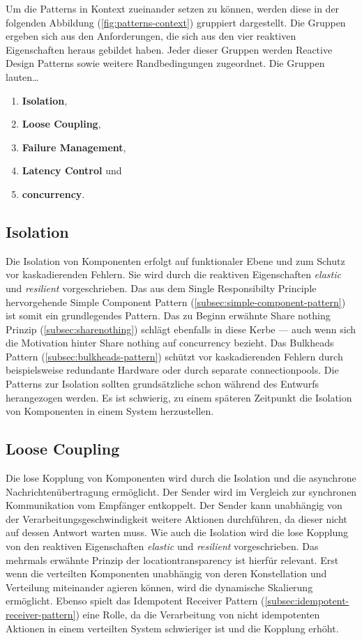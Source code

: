 Um die Patterns in Kontext zueinander setzen zu können, werden diese in der folgenden Abbildung (\ref{fig:patterns-context}) gruppiert dargestellt. Die Gruppen ergeben sich aus den Anforderungen, die sich aus den vier reaktiven Eigenschaften heraus gebildet haben. Jeder dieser Gruppen werden Reactive Design Patterns sowie weitere Randbedingungen zugeordnet. Die Gruppen lauten\ldots

\begin{enumerate}
  \item \textbf{Isolation},
  \item \textbf{Loose Coupling},
  \item \textbf{Failure Management},
  \item \textbf{Latency Control} und
  \item \textbf{\gls{concurrency}}.
\end{enumerate}

\pagebreak

\subsection{Isolation}
Die Isolation von Komponenten erfolgt auf funktionaler Ebene und zum Schutz vor kaskadierenden Fehlern. Sie wird durch die reaktiven Eigenschaften \textit{elastic} und \textit{resilient} vorgeschrieben. Das aus dem Single Responsibilty Principle hervorgehende Simple Component Pattern (\ref{subsec:simple-component-pattern}) ist somit ein grundlegendes Pattern. Das zu Beginn erwähnte Share nothing Prinzip (\ref{subsec:sharenothing}) schlägt ebenfalls in diese Kerbe --- auch wenn sich die Motivation hinter Share nothing auf \gls{concurrency} bezieht. Das Bulkheads Pattern (\ref{subsec:bulkheads-pattern}) schützt vor kaskadierenden Fehlern durch beispielsweise redundante Hardware oder durch separate \glspl{connectionpool}. Die Patterns zur Isolation sollten grundsätzliche schon während des Entwurfs herangezogen werden. Es ist schwierig, zu einem späteren Zeitpunkt die Isolation von Komponenten in einem System herzustellen.

\subsection{Loose Coupling}
Die lose Kopplung von Komponenten wird durch die Isolation und die asynchrone Nachrichtenübertragung ermöglicht. Der Sender wird im Vergleich zur synchronen Kommunikation vom Empfänger entkoppelt. Der Sender kann unabhängig von der Verarbeitungsgeschwindigkeit weitere Aktionen durchführen, da dieser nicht auf dessen Antwort warten muss. Wie auch die Isolation wird die lose Kopplung von den reaktiven Eigenschaften \textit{elastic} und \textit{resilient} vorgeschrieben. Das mehrmals erwähnte Prinzip der \gls{locationtransparency} ist hierfür relevant. Erst wenn die verteilten Komponenten unabhängig von deren Konstellation und Verteilung miteinander agieren können, wird die dynamische Skalierung ermöglicht. Ebenso spielt das Idempotent Receiver Pattern (\ref{subsec:idempotent-receiver-pattern}) eine Rolle, da die Verarbeitung von nicht idempotenten Aktionen in einem verteilten System schwieriger ist und die Kopplung erhöht.

